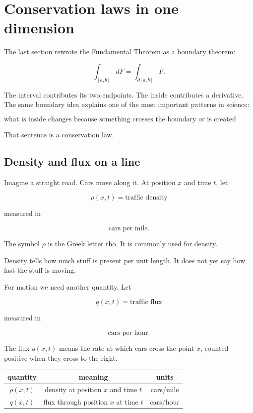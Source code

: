 \section{Conservation laws in one dimension}
\label{sec:conservation-laws-one-dimension}

The last section rewrote the Fundamental Theorem as a boundary theorem:

\[
\int_{[a,b]} dF=\int_{\partial[a,b]}F.
\]

The interval contributes its two endpoints.  The inside contributes a derivative.  The
same boundary idea explains one of the most important patterns in science:

\[
\boxed{
\text{what is inside changes because something crosses the boundary or is created inside.}
}
\]

That sentence is a conservation law.

\subsection{Density and flux on a line}
\label{subsec:density-and-flux-on-line}

Imagine a straight road.  Cars move along it.  At position \(x\) and time \(t\), let

\[
\rho(x,t)=\text{traffic density}
\]

measured in

\[
\text{cars per mile}.
\]

The symbol \(\rho\) is the Greek letter rho.  It is commonly used for density.

Density tells how much stuff is present per unit length.  It does not yet say how fast
the stuff is moving.

For motion we need another quantity.  Let

\[
q(x,t)=\text{traffic flux}
\]

measured in

\[
\text{cars per hour}.
\]

The flux \(q(x,t)\) means the rate at which cars cross the point \(x\), counted positive
when they cross to the right.

\begin{center}
\renewcommand{\arraystretch}{1.35}
\begin{tabular}{c|c|c}
\textbf{quantity} & \textbf{meaning} & \textbf{units} \\ \hline
\(\rho(x,t)\) & density at position \(x\) and time \(t\) & cars/mile \\
\(q(x,t)\) & flux through position \(x\) at time \(t\) & cars/hour
\end{tabular}
\end{center}

